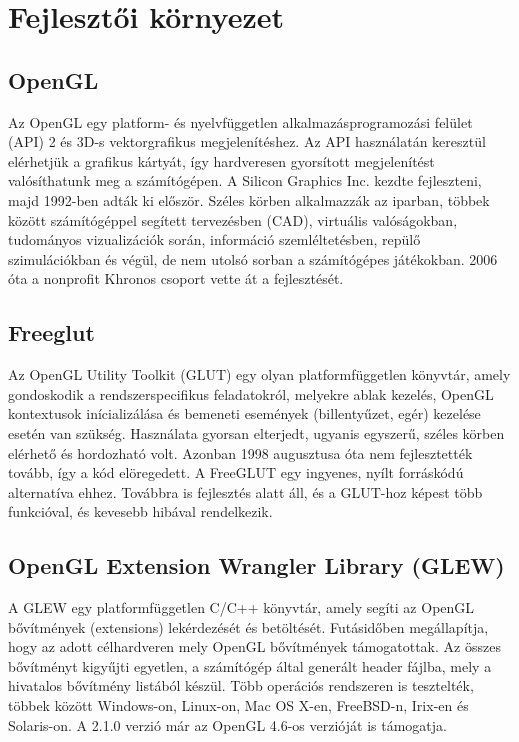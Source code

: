 

\section{Fejlesztői környezet}

\subsection{OpenGL}
Az OpenGL egy platform- és nyelvfüggetlen alkalmazásprogramozási felület (API) 2 és 3D-s vektorgrafikus megjelenítéshez. Az API használatán keresztül elérhetjük a grafikus kártyát, így hardveresen gyorsított megjelenítést valósíthatunk meg a számítógépen. A Silicon Graphics Inc. kezdte fejleszteni, majd 1992-ben adták ki először. Széles körben alkalmazzák az iparban, többek között számítógéppel segített tervezésben (CAD), virtuális valóságokban, tudományos vizualizációk során, információ szemléltetésben, repülő szimulációkban és végül, de nem utolsó sorban a számítógépes játékokban. 2006 óta a nonprofit Khronos csoport vette át a fejlesztését. \cite{wikiOGL}

\subsection{Freeglut}
Az OpenGL Utility Toolkit (GLUT) egy olyan platformfüggetlen könyvtár, amely gondoskodik a rendszerspecifikus feladatokról, melyekre ablak kezelés, OpenGL kontextusok inícializálása és bemeneti események (billentyűzet, egér) kezelése esetén van szükség. Használata gyorsan elterjedt, ugyanis egyszerű, széles körben elérhető és hordozható volt. Azonban 1998 augusztusa óta nem fejlesztették tovább, így a kód elöregedett. A FreeGLUT egy ingyenes, nyílt forráskódú alternatíva ehhez. Továbbra is fejlesztés alatt áll, és a GLUT-hoz képest több funkcióval, és kevesebb hibával rendelkezik.

\subsection{OpenGL Extension Wrangler Library (GLEW)}
A GLEW egy platformfüggetlen C/C++ könyvtár, amely segíti az OpenGL bővítmények (extensions) lekérdezését és betöltését. Futásidőben megállapítja, hogy az adott célhardveren mely OpenGL bővítmények támogatottak. Az összes bővítményt kigyűjti egyetlen, a számítógép által generált header fájlba, mely a hivatalos bővítmény listából készül. Több operációs rendszeren is tesztelték, többek között Windows-on, Linux-on, Mac OS X-en, FreeBSD-n, Irix-en és Solaris-on. A 2.1.0 verzió már az OpenGL 4.6-os verzióját is támogatja. 

